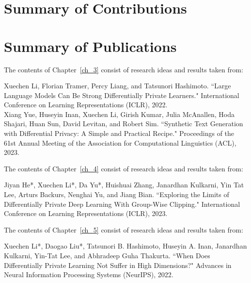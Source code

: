 \section{Summary of Contributions}\label{sec:overview_of_results}



\newpage
\section{Summary of Publications}

\noindent The contents of Chapter~\ref{ch_3} consist of research ideas and results taken from:

\begin{mdframed}[leftline=true, topline=false, rightline=false, bottomline=false, linewidth=2pt]
Xuechen Li, Florian Tramer, Percy Liang, and Tatsunori Hashimoto. ``Large Language Models Can Be Strong Differentially Private Learners." International Conference on Learning Representations (ICLR), 2022.~\cite{li2022large}\\

\noindent Xiang Yue, Huseyin Inan, Xuechen Li, Girish Kumar, Julia McAnallen, Hoda Shajari, Huan Sun, David Levitan, and Robert Sim. ``Synthetic Text Generation with Differential Privacy: A Simple and Practical Recipe." Proceedings of the 61st Annual Meeting of the Association for Computational Linguistics (ACL), 2023.~\cite{yue-etal-2023-synthetic}
\end{mdframed}

\noindent The contents of Chapter~\ref{ch_4} consist of research ideas and results taken from:

\begin{mdframed}[leftline=true, topline=false, rightline=false, bottomline=false, linewidth=2pt]
Jiyan He*, Xuechen Li*, Da Yu*, Huishuai Zhang, Janardhan Kulkarni, Yin Tat Lee, Arturs Backurs, Nenghai Yu, and Jiang Bian. ``Exploring the Limits of Differentially Private Deep Learning With Group-Wise Clipping." International Conference on Learning Representations (ICLR), 2023.~\cite{he2022exploring}
\end{mdframed}

\noindent The contents of Chapter~\ref{ch_5} consist of research ideas and results taken from:

\begin{mdframed}[leftline=true, topline=false, rightline=false, bottomline=false, linewidth=2pt]
Xuechen Li*, Daogao Liu*, Tatsunori B. Hashimoto, Huseyin A. Inan, Janardhan Kulkarni, Yin-Tat Lee, and Abhradeep Guha Thakurta. ``When Does Differentially Private Learning Not Suffer in High Dimensions?" Advances in Neural Information Processing Systems (NeurIPS), 2022.~\cite{li2022does}
\end{mdframed}


